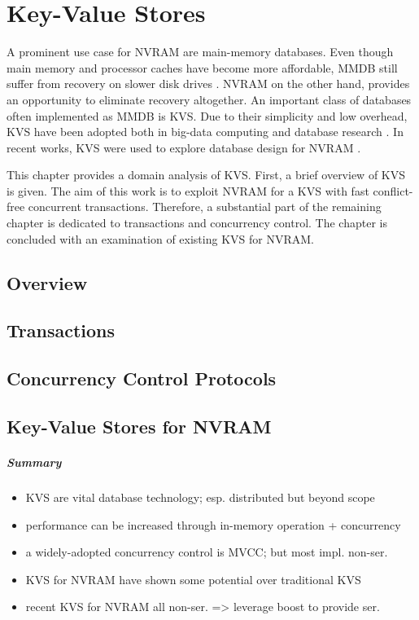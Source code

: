 \chapter{Key-Value Stores}
\label{ch:kvs}

A prominent use case for NVRAM are main-memory databases. Even though main
memory and processor caches have become more affordable, MMDB still suffer from
recovery on slower disk drives \cite{oukid2015instant, schwalb2016hyrise}. NVRAM
on the other hand, provides an opportunity to eliminate recovery altogether. An
important class of databases often implemented as MMDB is KVS. Due to their
simplicity and low overhead, KVS have been adopted both in big-data computing
and database research \cite{decandia2007dynamo, lakshman2010cassandra,
wang2015hydradb}. In recent works, KVS were used to explore database design for
NVRAM \cite{bailey2013exploring, zhou2016nvht, wu2016nvmcached}.

This chapter provides a domain analysis of KVS. First, a brief overview of KVS
is given. The aim of this work is to exploit NVRAM for a KVS with fast
conflict-free concurrent transactions. Therefore, a substantial part of the
remaining chapter is dedicated to transactions and concurrency control. The
chapter is concluded with an examination of existing KVS for NVRAM.

\section{Overview}


\section{Transactions}


\section{Concurrency Control Protocols}


\section{Key-Value Stores for NVRAM}

\paragraph{Summary}

\begin{itemize}
    \item KVS are vital database technology; esp. distributed but beyond scope
    \item performance can be increased through in-memory operation + concurrency
    \item a widely-adopted concurrency control is MVCC; but most impl. non-ser.
    \item KVS for NVRAM have shown some potential over traditional KVS
    \item recent KVS for NVRAM all non-ser. => leverage boost to provide ser.
\end{itemize}

